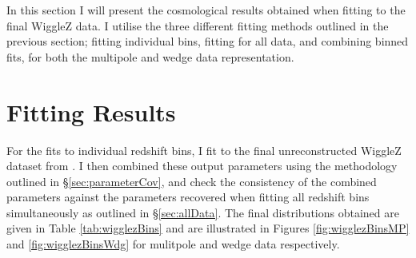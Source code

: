 \documentclass[titlesmallcaps, examinerscopy, copyrightpage]{uqthesis}
\begin{document}
In this section I will present the cosmological results obtained when fitting to the final WiggleZ data. I utilise the three different fitting methods outlined in the previous section; fitting individual bins, fitting for all data, and combining binned fits, for both the multipole and wedge data representation.\\


\section{Fitting Results}

For the fits to individual redshift bins, I fit to the final unreconstructed WiggleZ dataset from \citet{KazinKoda2014}. I then combined these output parameters using the methodology outlined in \S\ref{sec:parameterCov}, and check the consistency of the combined parameters against the parameters recovered when fitting all redshift bins simultaneously as outlined in \S\ref{sec:allData}. The final distributions obtained are given in Table \ref{tab:wigglezBins} and are illustrated in Figures \ref{fig:wigglezBinsMP} and \ref{fig:wigglezBinsWdg} for mulitpole and wedge data respectively.\\
\end{document}
